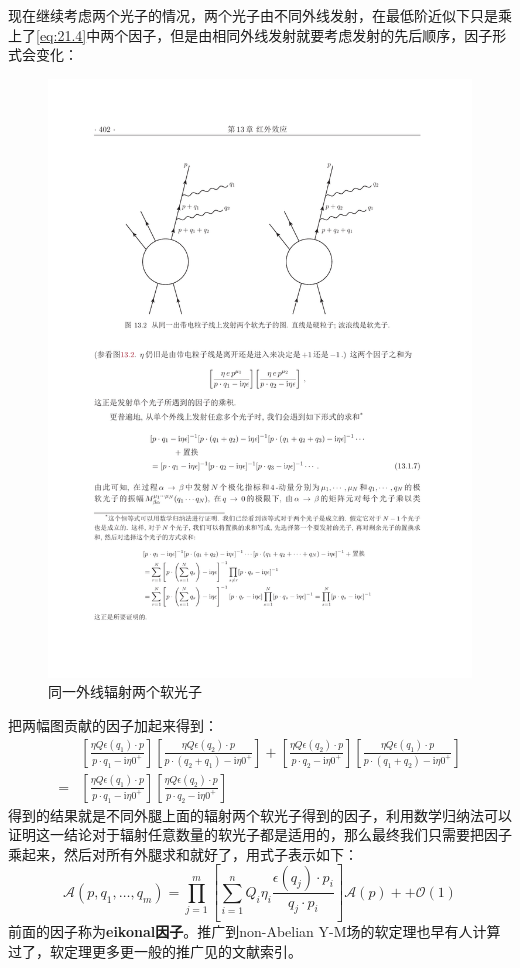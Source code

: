 现在继续考虑两个光子的情况，两个光子由不同外线发射，在最低阶近似下只是乘上了\ref{eq:21.4}中两个因子，但是由相同外线发射就要考虑发射的先后顺序，因子形式会变化：
\begin{figure}[H]
	\centering
	\includegraphics[width=0.8\linewidth]{figs/fig4.pdf}
	\caption{同一外线辐射两个软光子}
\end{figure}
把两幅图贡献的因子加起来得到：
\begin{equation}
	\begin{aligned}
	&\left[\frac{\eta Q\epsilon(q_1)\cdot p}{p\cdot q_1-\mathrm{i}\eta0^+}\right]\left[\frac{\eta Q\epsilon(q_2)\cdot p}{p\cdot(q_2+q_1)-\mathrm{i}\eta 0^+}\right]+\left[\frac{\eta Q\epsilon(q_2)\cdot p}{p\cdot q_2-\mathrm{i}\eta0^+}\right]\left[\frac{\eta Q\epsilon(q_1)\cdot p}{p\cdot(q_1+q_2)-\mathrm{i}\eta 0^+}\right]\\=&\left[\frac{\eta Q\epsilon(q_1)\cdot p}{p\cdot q_1-\mathrm{i}\eta0^+}\right]\left[\frac{\eta Q\epsilon(q_2)\cdot p}{p\cdot q_2-\mathrm{i}\eta 0^+}\right]	
	\end{aligned}
\end{equation}
得到的结果就是不同外腿上面的辐射两个软光子得到的因子，利用数学归纳法可以证明这一结论对于辐射任意数量的软光子都是适用的，那么最终我们只需要把因子乘起来，然后对所有外腿求和就好了，用式子表示如下：
\begin{equation}
	\boxed{\mathcal{A}(p,q_1,\ldots,q_m)=\prod_{j=1}^m\left[\sum_{i=1}^nQ_i\eta_i\frac{\epsilon(q_j)\cdot p_i}{q_j\cdot p_i}\right]\mathcal{A}(p)++\mathcal{O}(1)}
\end{equation}
前面的因子称为\textbf{eikonal因子}。推广到non-Abelian Y-M场的软定理也早有人计算过了\cite{Berends:1987me,Berends:1988zn,Mangano:1987kp,Mangano:1990by}，软定理更多更一般的推广见\cite{McLoughlin:2022ljp}的文献索引。

